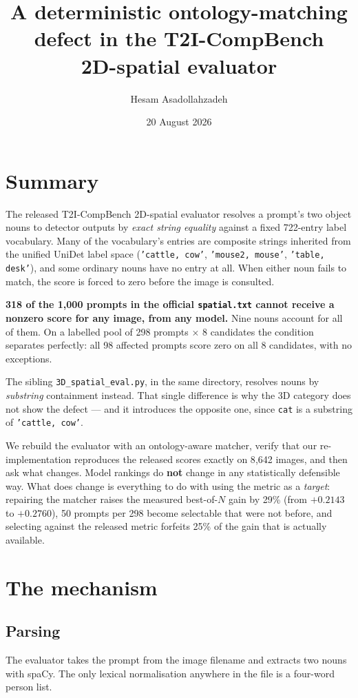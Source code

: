 \documentclass[11pt,a4paper]{article}
\title{\vspace{-1.6cm}A deterministic ontology-matching defect in the T2I-CompBench\\
2D-spatial evaluator\vspace{-0.2cm}}
\author{Hesam Asadollahzadeh}
\date{20 August 2026}
\newcommand{\code}[1]{\texttt{\small #1}}
\begin{document}
\maketitle
\vspace{-0.9cm}

\section*{Summary}

The released T2I-CompBench 2D-spatial evaluator resolves a prompt's two object nouns to detector
outputs by \emph{exact string equality} against a fixed 722-entry label vocabulary. Many of the
vocabulary's entries are composite strings inherited from the unified UniDet label space
(\code{'cattle, cow'}, \code{'mouse2, mouse'}, \code{'table, desk'}), and some ordinary nouns have no
entry at all. When either noun fails to match, the score is forced to zero before the image is
consulted.

\textbf{318 of the 1{,}000 prompts in the official \code{spatial.txt} cannot receive a nonzero score
for any image, from any model.} Nine nouns account for all of them. On a labelled pool of 298
prompts $\times$ 8 candidates the condition separates perfectly: all 98 affected prompts score zero
on all 8 candidates, with no exceptions.

The sibling \code{3D\_spatial\_eval.py}, in the same directory, resolves nouns by \emph{substring}
containment instead. That single difference is why the 3D category does not show the defect --- and it
introduces the opposite one, since \code{cat} is a substring of \code{'cattle, cow'}.

We rebuild the evaluator with an ontology-aware matcher, verify that our re-implementation reproduces
the released scores exactly on 8{,}642 images, and then ask what changes. Model rankings do
\textbf{not} change in any statistically defensible way. What does change is everything to do with
using the metric as a \emph{target}: repairing the matcher raises the measured best-of-$N$ gain by
29\% (from $+0.2143$ to $+0.2760$), 50 prompts per 298 become selectable that were not before, and
selecting against the released metric forfeits 25\% of the gain that is actually available.

\section{The mechanism}

\subsection{Parsing}
The evaluator takes the prompt from the image filename and extracts two nouns with spaCy. The only
lexical normalisation anywhere in the file is a four-word person list.
\end{document}
